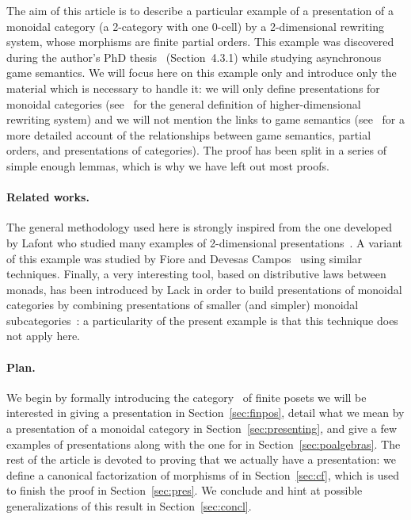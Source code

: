 \documentclass[submission,copyright,creativecommons]{eptcs}
\theoremstyle{definition}
\theoremstyle{remark}
\begin{document}
The aim of this article is to describe a particular example of a presentation of
a monoidal category (\ie a 2-category with one 0-cell) by a 2-dimensional
rewriting system, whose morphisms are finite partial orders. This example was
discovered during the author's PhD thesis~\cite{mimram:phd} (Section~4.3.1)
while studying asynchronous game semantics. We will focus here on this example
only and introduce only the material which is necessary to handle it: we will
only define presentations for monoidal categories (see~\cite{burroni1993higher}
for the general definition of higher-dimensional rewriting system) and we will
not mention the links to game semantics
(see~\cite{mimram:phd,mellies2007asynchronous,mimram2011structure} for a more
detailed account of the relationships between game semantics, partial orders,
and presentations of categories). The proof has been split in a series of simple
enough lemmas, which is why we have left out most proofs.

\paragraph{Related works.}
The general methodology used here is strongly inspired from the one developed by
Lafont who studied many examples of 2-dimensional
presentations~\cite{lafont2003towards}. A variant of this example was studied by
Fiore and Devesas Campos~\cite{fiore2013algebra} using similar
techniques. Finally, a very interesting tool, based on distributive laws between
monads, has been introduced by Lack in order to build presentations of monoidal
categories by combining presentations of smaller (and simpler) monoidal
subcategories~\cite{lack2004composing}: a particularity of the present example
is that this technique does not apply here.



\paragraph{Plan.}
We begin by formally introducing the category~ of finite posets we will be
interested in giving a presentation in Section~\ref{sec:finpos}, detail what we
mean by a presentation of a monoidal category in Section~\ref{sec:presenting},
and give a few examples of presentations along with the one for  in
Section~\ref{sec:poalgebras}. The rest of the article is devoted to proving that
we actually have a presentation: we define a canonical factorization of
morphisms of  in Section~\ref{sec:cf}, which is used to finish the proof in
Section~\ref{sec:pres}. We conclude and hint at possible generalizations of this
result in Section~\ref{sec:concl}.
\end{document}

